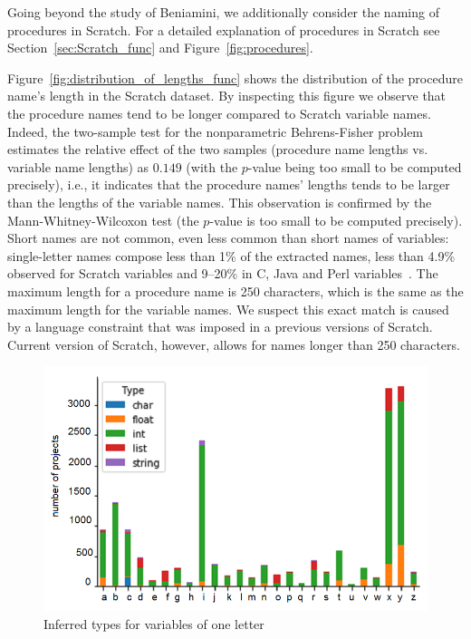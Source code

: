 \documentclass[conference]{IEEEtran}
\begin{document}
Going beyond the study of Beniamini, we additionally consider the naming of procedures in Scratch. 
For a detailed explanation of procedures in Scratch see Section~\ref{sec:Scratch_func} and Figure~\ref{fig:procedures}.  

Figure~\ref{fig:distribution_of_lengths_func} shows the distribution of the procedure name's length in the Scratch dataset. 
By inspecting this figure we observe that the procedure names tend to be longer compared to Scratch variable names. 
Indeed, the two-sample test for the nonparametric Behrens-Fisher problem estimates the relative effect of the two samples (procedure name lengths vs. variable name lengths) as $0.149$ (with the $p$-value being too small to be computed precisely), i.e., it indicates that the procedure names' lengths tends to be larger than the lengths of the variable names. 
This observation is confirmed by the Mann-Whitney-Wilcoxon test (the $p$-value is too small to be computed precisely).
Short names are not common, even less common than short names of variables: single-letter names compose less than 1\% of the extracted names, less than 4.9\% observed for Scratch variables and 9--20\% in C, Java and Perl variables~\cite{Beniamini}. 
The maximum length for a procedure name is 250 characters, which is the same as the maximum length for the variable names. 
We suspect this exact match is caused by a language constraint that was imposed in a previous versions of Scratch. 
Current version of Scratch, however, allows for names longer than 250 characters. 
\begin{figure}[!b]
	\begin{center}
		\includegraphics[width=\columnwidth]{fig/project/one_letter_type_double}
		\caption{Inferred types for variables of one letter}
		\label{fig:one_letter_type}
	\end{center}
\end{figure} 
\end{document}
